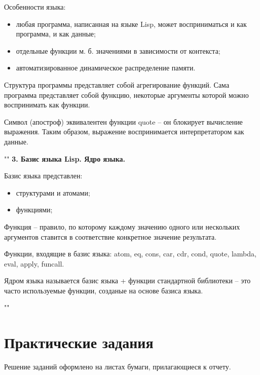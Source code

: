 \documentclass[12pt]{report}
\begin{document}
Особенности языка:
\begin{itemize}
	\item любая программа, написанная на языке Lisp, может восприниматься и как программа, и как данные;
	\item отдельные функции м. б. значениями в зависимости от контекста;
	\item автоматизированное динамическое распределение памяти.
\end{itemize}

Структура программы представляет собой агрегирование функций. Сама программа представляет собой функцию, некоторые аргументы которой можно воспринимать как функции.

Символ \textquotesingle (апостроф) эквивалентен функции quote – он блокирует вычисление выражения. Таким образом, выражение воспринимается интерпретатором как данные.

""\newline
\textbf{3. Базис языка Lisp. Ядро языка.}

Базис языка представлен:
\begin{itemize}
	\item структурами и атомами;
	\item функциями;
\end{itemize}

Функция -- правило, по которому каждому значению одного или нескольких аргументов ставится в соответствие конкретное значение результата.

Функции, входящие в базис языка: atom, eq, cons, car, cdr, cond, quote, lambda, eval, apply, funcall.

Ядром языка называется базис языка + функции стандартной библиотеки -- это часто используемые функции, созданые на основе базиса языка.

""\newline
\chapter*{Практические задания}

Решение заданий оформлено на листах бумаги, прилагающиеся к отчету.
\end{document}
